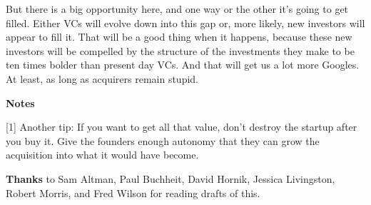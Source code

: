 But there is a big opportunity here, and one way or the other it's going
to get filled. Either VCs will evolve down into this gap or, more
likely, new investors will appear to fill it. That will be a good thing
when it happens, because these new investors will be compelled by the
structure of the investments they make to be ten times bolder than
present day VCs. And that will get us a lot more Googles. At least, as
long as acquirers remain stupid.

\textbf{Notes}

{[}1{]} Another tip: If you want to get all that value, don't destroy
the startup after you buy it. Give the founders enough autonomy that
they can grow the acquisition into what it would have become.

\textbf{Thanks} to Sam Altman, Paul Buchheit, David Hornik, Jessica
Livingston, Robert Morris, and Fred Wilson for reading drafts of this.
